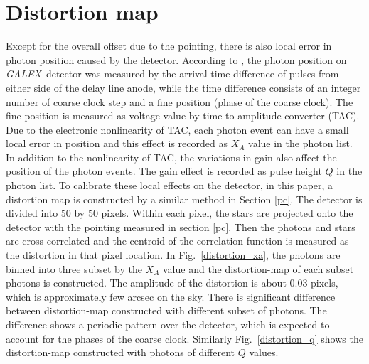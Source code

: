 \documentclass[12pt, preprint]{aastex}
\newcommand{\project}[1]{\textsl{#1}}
\newcommand{\galex}{\project{GALEX}}
\begin{document}
\section{Distortion map}
\label{dm}
Except for the overall offset due to the pointing, there is also local error in photon position caused by the detector. 
According to \cite{galex_cal}, the photon position on \galex\ detector was measured by the arrival time difference of pulses from either side of the delay line anode, while the time difference consists of an integer number of coarse clock step and a fine position (phase of the coarse clock).
The fine position is measured as voltage value by time-to-amplitude converter (TAC).
Due to the electronic nonlinearity of TAC, each photon event can have a small local error in position and this effect is recorded as $X_A$ value in the photon list.
In addition to the nonlinearity of TAC, the variations in gain also affect the position of the photon events.
The gain effect is recorded as pulse height $Q$ in the photon list.
To calibrate these local effects on the detector, in this paper, a distortion map is constructed by a similar method in Section \ref{pc}.  
The detector is divided into 50 by 50 pixels. 
Within each pixel, the stars are projected onto the detector with the pointing measured in section \ref{pc}.
Then the photons and stars are cross-correlated and the centroid of the correlation function is measured as the distortion in that pixel location.
In Fig.~\ref{distortion_xa}, the photons are binned into three subset by the $X_A$ value and the distortion-map of each subset photons is constructed.
The amplitude of the distortion is about 0.03 pixels, which is approximately few arcsec on the sky.
There is significant difference between distortion-map constructed with different subset of photons.
The difference shows a periodic pattern over the detector, which is expected to account for the phases of the coarse clock.   
Similarly Fig.~\ref{distortion_q} shows the distortion-map constructed with photons of different $Q$ values.
\end{document}
